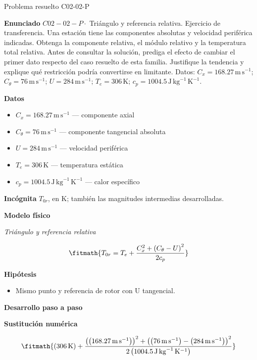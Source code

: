 \documentclass[10pt,openany]{book}
\begin{document}
\begin{studiumworked}{Problema resuelto C02-02-P}


\noindent\textbf{Enunciado}
\(C02-02-P \cdot\) Triángulo y referencia relativa. Ejercicio de transferencia. Una estación tiene las componentes absolutas y velocidad periférica indicadas. Obtenga la componente relativa, el módulo relativo y la temperatura total relativa. Antes de consultar la solución, prediga el efecto de cambiar el primer dato respecto del caso resuelto de esta familia. Justifique la tendencia y explique qué restricción podría convertirse en limitante. Datos: \(C_x=168.27\, \mathrm{m}\,\mathrm{s}^{-1}\); \(C_\theta=76\, \mathrm{m}\,\mathrm{s}^{-1}\); \(U=284\, \mathrm{m}\,\mathrm{s}^{-1}\); \(T_e=306\, \mathrm{K}\); \(c_p=1004.5\, \mathrm{J}\,\mathrm{kg}^{-1}\,\mathrm{K}^{-1}\).

\noindent\textbf{Datos}
\begin{itemize}
\item $C_x = 168.27\,\mathrm{m}\,\mathrm{s}^{-1}$ — componente axial
\item $C_\theta = 76\,\mathrm{m}\,\mathrm{s}^{-1}$ — componente tangencial absoluta
\item $U = 284\,\mathrm{m}\,\mathrm{s}^{-1}$ — velocidad periférica
\item $T_e = 306\,\mathrm{K}$ — temperatura estática
\item $c_p = 1004.5\,\mathrm{J}\,\mathrm{kg}^{-1}\,\mathrm{K}^{-1}$ — calor específico
\end{itemize}

\noindent\textbf{Incógnita}
$T_{0r}$, en $\mathrm{K}$; también las magnitudes intermedias desarrolladas.

\noindent\textbf{Modelo físico}

\noindent\textit{Triángulo y referencia relativa}

\[
\fitmath{T_{0r}=T_e + \frac{C_x^{2} + \left(C_\theta - U\right)^{2}}{2 c_p}}
\]

\noindent\textbf{Hipótesis}
\begin{itemize}
\item Mismo punto y referencia de rotor con U tangencial.
\end{itemize}

\noindent\textbf{Desarrollo paso a paso}



\noindent\textbf{Sustitución numérica}

\[
\fitmath{\left(306\,\mathrm{K}\right) + \frac{\left(\left(168.27\,\mathrm{m}\,\mathrm{s}^{-1}\right)\right)^{2} + \left(\left(76\,\mathrm{m}\,\mathrm{s}^{-1}\right) - \left(284\,\mathrm{m}\,\mathrm{s}^{-1}\right)\right)^{2}}{2 \left(1004.5\,\mathrm{J}\,\mathrm{kg}^{-1}\,\mathrm{K}^{-1}\right)}}
\]


\end{studiumworked}
\end{document}
